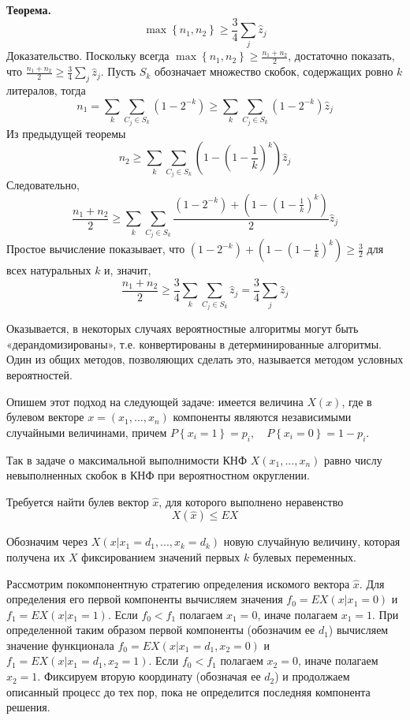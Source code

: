 \begin{problem}
\noindent \textbf{Теорема.}
\[\max \left\{n_{1} ,n_{2} \right\}\ge \frac{3}{4} \sum _{j}\hat{z}_{j}  \] 
Доказательство. Поскольку всегда $\max \left\{n_{1} ,n_{2} \right\}\ge \frac{n_{1} +n_{2} }{2} $, достаточно показать, что $\frac{n_{1} +n_{2} }{2} \ge \frac{3}{4} \sum _{j}\hat{z}_{j}  $. Пусть $S_{k} $ обозначает множество скобок, содержащих ровно $k$ литералов, тогда
\[n_{1} =\sum _{k}\sum _{C_{j} \in S_{k} }(1-2^{-k} )  \ge \sum _{k}\sum _{C_{j} \in S_{k} }(1-2^{-k} )\hat{z}_{j}   \] 
Из предыдущей теоремы
\[n_{2} \ge \sum _{k}\sum _{C_{j} \in S_{k} }\left(1-\left(1-\frac{1}{k} \right)^{k} \right)\hat{z}_{j}   \] 
Следовательно,
\[\frac{n_{1} +n_{2} }{2} \ge \sum _{k}\sum _{C_{j} \in S_{k} }\frac{\left(1-2^{-k} \right)+\left(1-\left(1-\frac{1}{k} \right)^{k} \right)}{2} \hat{z}_{j}   \] 
Простое вычисление показывает, что $\left(1-2^{-k} \right)+\left(1-\left(1-\frac{1}{k} \right)^{k} \right)\ge \frac{3}{2} $ для всех натуральных $k$ и, значит,
\[\frac{n_{1} +n_{2} }{2} \ge \frac{3}{4} \sum _{k}\sum _{C_{j} \in S_{k} }\hat{z}_{j}   =\frac{3}{4} \sum _{j}\hat{z}_{j}  \] 


\noindent Оказывается, в некоторых случаях вероятностные алгоритмы могут быть «дерандомизированы», т.е. конвертированы в детерминированные алгоритмы. Один из общих методов, позволяющих сделать это, называется методом условных вероятностей.

\noindent Опишем этот подход на следующей задаче: имеется величина $X(x)$, где в булевом векторе $x=(x_{1} ,...,x_{n} )$ компоненты являются независимыми случайными величинами, причем $P\left\{x_{i} =1\right\}=p_{i} ,\quad P\left\{x_{i} =0\right\}=1-p_{i} $.

 Так в задаче о максимальной выполнимости КНФ $X(x_{1} ,...,x_{n} )$ равно числу невыполненных скобок в КНФ при вероятностном округлении.

 Требуется найти булев вектор $\hat{x}$, для которого выполнено неравенство
\[X(\hat{x})\le EX\] 

Обозначим через $X(x|x_{1} =d_{1} ,...,x_{k} =d_{k} )$ новую случайную величину, которая получена их $X$ фиксированием значений первых $k$ булевых переменных.

Рассмотрим покомпонентную стратегию определения искомого вектора $\hat{x}$. Для определения его первой компоненты вычисляем значения $f_{0} =EX(x|x_{1} =0)$ и $f_{1} =EX(x|x_{1} =1)$. Если $f_{0} <f_{1} $ полагаем $x_{1} =0$, иначе полагаем $x_{1} =1$. При определенной таким образом первой компоненты (обозначим ее $d_{1} $) вычисляем значение функционала $f_{0} =EX(x|x_{1} =d_{1} ,x_{2} =0)$ и $f_{1} =EX(x|x_{1} =d_{1} ,x_{2} =1)$. Если $f_{0} <f_{1} $ полагаем $x_{2} =0$, иначе полагаем $x_{2} =1$. Фиксируем вторую координату (обозначая ее $d_{2} $) и продолжаем описанный процесс до тех пор, пока не определится последняя компонента решения.


\end{problem}
